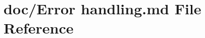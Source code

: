 \hypertarget{_error_01handling_8md}{\section{doc/\-Error handling.\-md File Reference}
\label{_error_01handling_8md}
}
